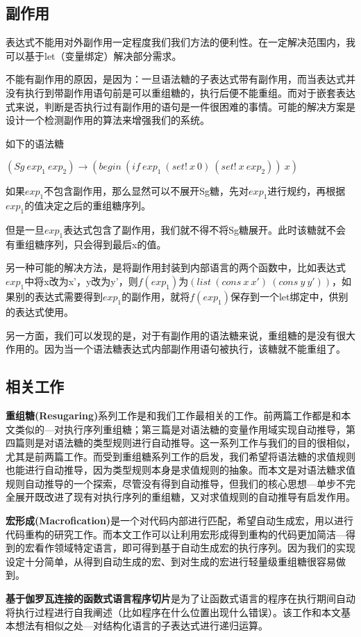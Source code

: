 \label{mark:side}\subsection{副作用}

表达式不能用对外副作用一定程度我们我们方法的便利性。在一定解决范围内，我可以基于let（变量绑定）解决部分需求。

不能有副作用的原因，是因为：一旦语法糖的子表达式带有副作用，而当表达式并没有执行到带副作用语句前是可以重组糖的，执行后便不能重组。而对于嵌套表达式来说，判断是否执行过有副作用的语句是一件很困难的事情。可能的解决方案是设计一个检测副作用的算法来增强我们的系统。

如下的语法糖

$(Sg~exp_{1}~exp_{2}) → (begin~(if~exp_{1}~(set!~x~0)~(set!~x~exp_{2}))~x)$

如果$exp_{1}$不包含副作用，那么显然可以不展开Sg糖，先对$exp_{1}$进行规约，再根据$exp_{1}$的值决定之后的重组糖序列。

但是一旦$exp_{1}$表达式包含了副作用，我们就不得不将Sg糖展开。此时该糖就不会有重组糖序列，只会得到最后x的值。

另一种可能的解决方法，是将副作用封装到内部语言的两个函数中，比如表达式$exp_{1}$中将x改为x'，y改为y'，则$f(exp_{1})$为$(list~(cons~x~x')~(cons~y~y'))$，如果别的表达式需要得到$exp_{1}$的副作用，就将$f(exp_{1})$保存到一个let绑定中，供别的表达式使用。

另一方面，我们可以发现的是，对于有副作用的语法糖来说，重组糖的是没有很大作用的。因为当一个语法糖表达式内部副作用语句被执行，该糖就不能重组了。



\label{mark:relative}\subsection{相关工作}

{\bfseries 重组糖(Resugaring)}系列工作\cite{resugaring}\cite{hygienic}\cite{resugaringscpoe}\cite{resugaringtype}是和我们工作最相关的工作。前两篇工作都是和本文类似的---对执行序列重组糖；第三篇是对语法糖的变量作用域实现自动推导，第四篇则是对语法糖的类型规则进行自动推导。这一系列工作与我们的目的很相似，尤其是前两篇工作。而受到重组糖系列工作的启发，我们希望将语法糖的求值规则也能进行自动推导，因为类型规则本身是求值规则的抽象。而本文是对语法糖求值规则自动推导的一个探索，尽管没有得到自动推导，但我们的核心思想---单步不完全展开既改进了现有对执行序列的重组糖，又对求值规则的自动推导有启发作用。

{\bfseries 宏形成(Macrofication)}\cite{Macrofication}是一个对代码内部进行匹配，希望自动生成宏，用以进行代码重构的研究工作。而本文工作可以让利用宏形成得到重构的代码更加简洁---得到的宏看作领域特定语言，即可得到基于自动生成宏的执行序列。因为我们的实现设定十分简单，从得到自动生成的宏、到对生成的宏进行轻量级重组糖很容易做到。

{\bfseries 基于伽罗瓦连接的函数式语言程序切片}\cite{slicing}是为了让函数式语言的程序在执行期间自动将执行过程进行自我阐述（比如程序在什么位置出现什么错误）。该工作和本文基本想法有相似之处---对结构化语言的子表达式进行递归运算。
